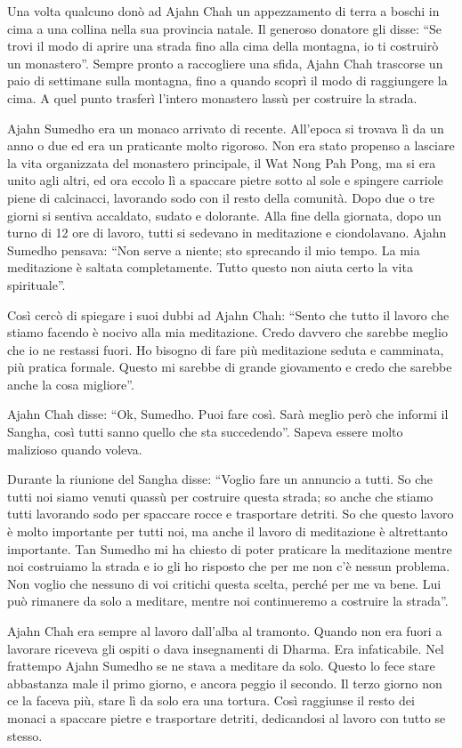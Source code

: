 Una volta qualcuno donò ad Ajahn Chah un appezzamento di terra a boschi in cima a una collina nella sua provincia natale. Il generoso donatore gli disse: ``Se trovi il modo di aprire una strada fino alla cima della montagna, io ti costruirò un monastero''. Sempre pronto a raccogliere una sfida, Ajahn Chah trascorse un paio di settimane sulla montagna, fino a quando scoprì il modo di raggiungere la cima. A quel punto trasferì l'intero monastero lassù per costruire la strada.

Ajahn Sumedho era un monaco arrivato di recente. All'epoca si trovava lì da un anno o due ed era un praticante molto rigoroso. Non era stato propenso a lasciare la vita organizzata del monastero principale, il Wat Nong Pah Pong, ma si era unito agli altri, ed ora eccolo lì a spaccare pietre sotto al sole e spingere carriole piene di calcinacci, lavorando sodo con il resto della comunità. Dopo due o tre giorni si sentiva accaldato, sudato e dolorante. Alla fine della giornata, dopo un turno di 12 ore di lavoro, tutti si sedevano in meditazione e ciondolavano. Ajahn Sumedho pensava: ``Non serve a niente; sto sprecando il mio tempo. La mia meditazione è saltata completamente. Tutto questo non aiuta certo la vita spirituale''.

Così cercò di spiegare i suoi dubbi ad Ajahn Chah: ``Sento che tutto il lavoro che stiamo facendo è nocivo alla mia meditazione. Credo davvero che sarebbe meglio che io ne restassi fuori. Ho bisogno di fare più meditazione seduta e camminata, più pratica formale. Questo mi sarebbe di grande giovamento e credo che sarebbe anche la cosa migliore''.

Ajahn Chah disse: ``Ok, Sumedho. Puoi fare così. Sarà meglio però che informi il Sangha, così tutti sanno quello che sta succedendo''. Sapeva essere molto malizioso quando voleva.

Durante la riunione del Sangha disse: ``Voglio fare un annuncio a tutti. So che tutti noi siamo venuti quassù per costruire questa strada; so anche che stiamo tutti lavorando sodo per spaccare rocce e trasportare detriti. So che questo lavoro è molto importante per tutti noi, ma anche il lavoro di meditazione è altrettanto importante. Tan Sumedho mi ha chiesto di poter praticare la meditazione mentre noi costruiamo la strada e io gli ho risposto che per me non c'è nessun problema. Non voglio che nessuno di voi critichi questa scelta, perché per me va bene. Lui può rimanere da solo a meditare, mentre noi continueremo a costruire la strada''.

Ajahn Chah era sempre al lavoro dall'alba al tramonto. Quando non era fuori a lavorare riceveva gli ospiti o dava insegnamenti di Dharma. Era infaticabile. Nel frattempo Ajahn Sumedho se ne stava a meditare da solo. Questo lo fece stare abbastanza male il primo giorno, e ancora peggio il secondo. Il terzo giorno non ce la faceva più, stare lì da solo era una tortura. Così raggiunse il resto dei monaci a spaccare pietre e trasportare detriti, dedicandosi al lavoro con tutto se stesso. 

